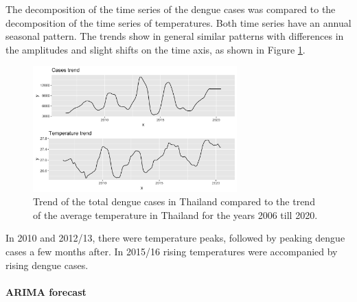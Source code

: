 	The decomposition of the time series of the dengue cases was compared to the decomposition of the time series of temperatures. Both time series have an annual seasonal pattern. The trends show in general similar patterns with differences in the amplitudes and slight shifts on the time axis, as shown in Figure \ref{fig:Trend_temp_cases}.
	\begin{figure}[hbpt] 
		\centering
		\includegraphics[width=0.7\textwidth]{fig/Trend_temp_cases.png}
		\caption{Trend of the total dengue cases in Thailand compared to the trend of the average temperature in Thailand for the years 2006 till 2020.}
		\label{fig:Trend_temp_cases}
	\end{figure}
	 In 2010 and 2012/13, there were temperature peaks, followed by peaking dengue cases a few months after. In 2015/16 rising temperatures were accompanied by rising dengue cases. 
	\paragraph{ARIMA forecast}
	
